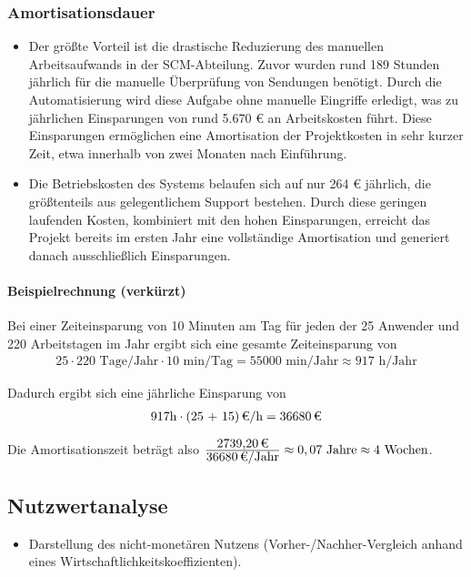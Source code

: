 \subsubsection{Amortisationsdauer}
\label{sec:Amortisationsdauer}
\begin{itemize}
	\item Der größte Vorteil ist die drastische Reduzierung des manuellen Arbeitsaufwands in der SCM-Abteilung. Zuvor wurden rund 189 Stunden jährlich für die manuelle Überprüfung von Sendungen benötigt. Durch die Automatisierung wird diese Aufgabe ohne manuelle Eingriffe erledigt, was zu jährlichen Einsparungen von rund 5.670 € an Arbeitskosten führt. Diese Einsparungen ermöglichen eine Amortisation der Projektkosten in sehr kurzer Zeit, etwa innerhalb von zwei Monaten nach Einführung.
	\item Die Betriebskosten des Systems belaufen sich auf nur 264 € jährlich, die größtenteils aus gelegentlichem Support bestehen. Durch diese geringen laufenden Kosten, kombiniert mit den hohen Einsparungen, erreicht das Projekt bereits im ersten Jahr eine vollständige Amortisation und generiert danach ausschließlich Einsparungen.
	
\end{itemize}

\paragraph{Beispielrechnung (verkürzt)}
Bei einer Zeiteinsparung von 10 Minuten am Tag für jeden der 25 Anwender und 220 Arbeitstagen im Jahr ergibt sich eine gesamte Zeiteinsparung von 
\begin{eqnarray}
25 \cdot 220 \mbox{ Tage/Jahr} \cdot 10 \mbox{ min/Tag} = 55000 \mbox{ min/Jahr} \approx 917 \mbox{ h/Jahr} 
\end{eqnarray}

Dadurch ergibt sich eine jährliche Einsparung von 
\begin{eqnarray}
917 \mbox{h} \cdot \eur{(25 + 15)}{\mbox{/h}} = \eur{36680}
\end{eqnarray}

Die Amortisationszeit beträgt also $\frac{\eur{2739,20}}{\eur{36680}\mbox{/Jahr}} \approx 0,07 \mbox{ Jahre} \approx 4 \mbox{ Wochen}$.


\subsection{Nutzwertanalyse}
\label{sec:Nutzwertanalyse}
\begin{itemize}
	\item Darstellung des nicht-monetären Nutzens (\zB Vorher-/Nachher-Vergleich anhand eines Wirtschaftlichkeitskoeffizienten). 
\end{itemize}


